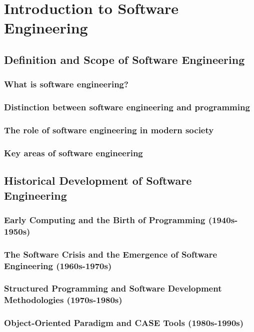 \chapter{Introduction to Software Engineering}
\begin{refsection}

\section{Definition and Scope of Software Engineering}
\subsection{What is software engineering?}
\subsection{Distinction between software engineering and programming}
\subsection{The role of software engineering in modern society}
\subsection{Key areas of software engineering}

\newpage
  
\section{Historical Development of Software Engineering}
\subsection{Early Computing and the Birth of Programming (1940s-1950s)}
\subsection{The Software Crisis and the Emergence of Software Engineering (1960s-1970s)}
\subsection{Structured Programming and Software Development Methodologies (1970s-1980s)}
\subsection{Object-Oriented Paradigm and CASE Tools (1980s-1990s)}

\end{refsection}
